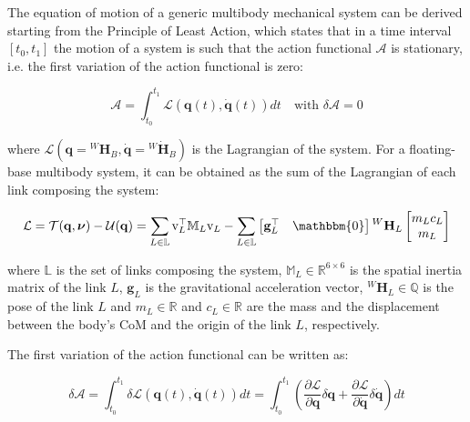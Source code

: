 The equation of motion of a generic multibody mechanical system can be derived starting from the Principle of Least Action, which states that in a time interval $[t _0, t _1]$ the motion of a system is such that the action functional $\mathcal{A}$ is stationary, i.e. the first variation of the action functional is zero:

\begin{equation}
    \mathcal{A} = \int _{t _0} ^{t _1} \mathcal{L} (\mathbf{q}(t), \mathbf{\dot{q}}(t)) dt \quad \text{with } \delta \mathcal{A} = 0
\end{equation}

where $\mathcal{L} (\mathbf{q} = {}^W\mathbf{H} _B, \dot{\mathbf{q}} = {}^W\dot{\mathbf{H}} _B)$ is the Lagrangian of the system. For a floating-base multibody system, it can be obtained as the sum of the Lagrangian of each link composing the system:

\begin{equation}
    \mathcal{L} = \mathcal{T}(\mathbf{q},\boldsymbol{\nu}) - \mathcal{U}(\mathbf{q}) = \sum _{L \in \mathbb{L}} \mathrm{v} ^\top _L \mathbb{M} _L \mathrm{v} _L - \sum _{L \in \mathbb{L}} \begin{bmatrix}
        \mathbf{g} ^\top _L & \mathbbm{0}
    \end{bmatrix} {}^W\mathbf{H} _L
    \begin{bmatrix}
        m _L c _L \\ m _L
    \end{bmatrix}
\end{equation}

where $\mathbb{L}$ is the set of links composing the system, $\mathbb{M} _L \in \mathbb{R} ^{6 \times 6}$ is the spatial inertia matrix of the link $L$, $\mathbf{g} _L$ is the gravitational acceleration vector, ${}^W\mathbf{H} _L \in \mathbb{Q}$ is the pose of the link $L$ and $m _L \in \mathbb{R}$ and $c _L \in \mathbb{R}$ are the mass and the displacement between the body's \ac{CoM} and the origin of the link $L$, respectively.

The first variation of the action functional can be written as:

\begin{equation}
    \delta \mathcal{A} = \int _{t _0} ^{t _1} \delta \mathcal{L} (\mathbf{q}(t), \mathbf{\dot{q}}(t))dt = \int _{t _0} ^{t _1} \left( \frac{\partial \mathcal{L}}{\partial \mathbf{q}} \delta \mathbf{q} + \frac{\partial \mathcal{L}}{\partial \mathbf{\dot{q}}} \delta \mathbf{\dot{q}} \right) dt
\end{equation}

